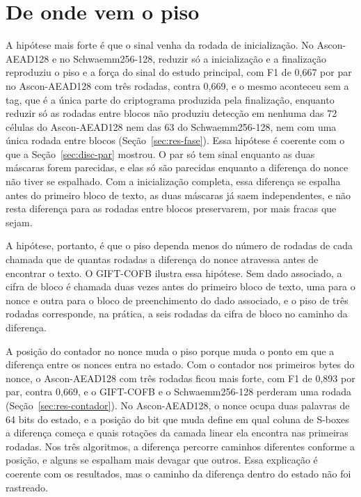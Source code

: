 \section{De onde vem o piso}
\label{sec:disc-origem}

A hipótese mais forte é que o sinal venha da rodada de inicialização. No Ascon-AEAD128 e no Schwaemm256-128, reduzir só a inicialização e a finalização reproduziu o piso e a força do sinal do estudo principal, com F1 de 0,667 por par no Ascon-AEAD128 com três rodadas, contra 0,669, e o mesmo aconteceu sem a tag, que é a única parte do criptograma produzida pela finalização, enquanto reduzir só as rodadas entre blocos não produziu detecção em nenhuma das 72 células do Ascon-AEAD128 nem das 63 do Schwaemm256-128, nem com uma única rodada entre blocos (Seção~\ref{sec:res-fase}). Essa hipótese é coerente com o que a Seção~\ref{sec:disc-par} mostrou. O par só tem sinal enquanto as duas máscaras forem parecidas, e elas só são parecidas enquanto a diferença do nonce não tiver se espalhado. Com a inicialização completa, essa diferença se espalha antes do primeiro bloco de texto, as duas máscaras já saem independentes, e não resta diferença para as rodadas entre blocos preservarem, por mais fracas que sejam.

A hipótese, portanto, é que o piso dependa menos do número de rodadas de cada chamada que de quantas rodadas a diferença do nonce atravessa antes de encontrar o texto. O GIFT-COFB ilustra essa hipótese. Sem dado associado, a cifra de bloco é chamada duas vezes antes do primeiro bloco de texto, uma para o nonce e outra para o bloco de preenchimento do dado associado, e o piso de três rodadas corresponde, na prática, a seis rodadas da cifra de bloco no caminho da diferença.

A posição do contador no nonce muda o piso porque muda o ponto em que a diferença entre os nonces entra no estado. Com o contador nos primeiros bytes do nonce, o Ascon-AEAD128 com três rodadas ficou mais forte, com F1 de 0,893 por par, contra 0,669, e o GIFT-COFB e o Schwaemm256-128 perderam uma rodada (Seção~\ref{sec:res-contador}). No Ascon-AEAD128, o nonce ocupa duas palavras de 64 bits do estado, e a posição do bit que muda define em qual coluna de S-boxes a diferença começa e quais rotações da camada linear ela encontra nas primeiras rodadas. Nos três algoritmos, a diferença percorre caminhos diferentes conforme a posição, e alguns se espalham mais devagar que outros. Essa explicação é coerente com os resultados, mas o caminho da diferença dentro do estado não foi rastreado.

